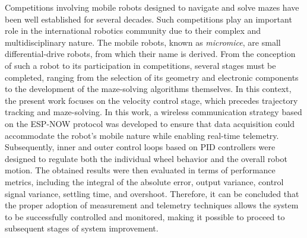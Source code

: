 Competitions involving mobile robots designed to navigate and solve mazes have been well established for several decades. Such competitions play an important role in the international robotics community due to their complex and multidisciplinary nature. The mobile robots, known as \textit{micromice}, are small differential-drive robots, from which their name is derived. From the conception of such a robot to its participation in competitions, several stages must be completed, ranging from the selection of its geometry and electronic components to the development of the maze-solving algorithms themselves. In this context, the present work focuses on the velocity control stage, which precedes trajectory tracking and maze-solving. In this work, a wireless communication strategy based on the ESP-NOW protocol was developed to ensure that data acquisition could accommodate the robot's mobile nature while enabling real-time telemetry. Subsequently, inner and outer control loops based on PID controllers were designed to regulate both the individual wheel behavior and the overall robot motion. The obtained results were then evaluated in terms of performance metrics, including the integral of the absolute error, output variance, control signal variance, settling time, and overshoot. Therefore, it can be concluded that the proper adoption of measurement and telemetry techniques allows the system to be successfully controlled and monitored, making it possible to proceed to subsequent stages of system improvement.


